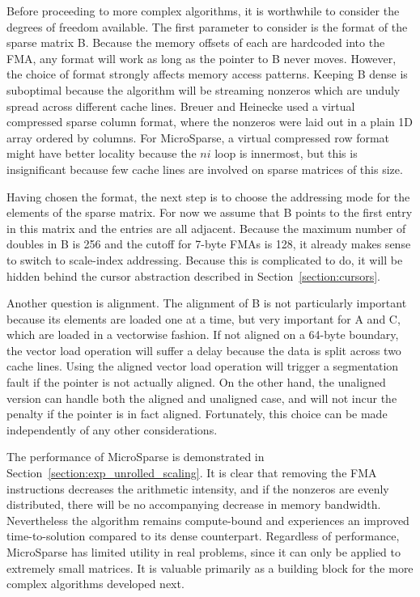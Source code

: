 Before proceeding to more complex algorithms, it is worthwhile to consider the degrees of freedom available. The first parameter to consider is the format of the sparse matrix B. Because the memory offsets of each  are hardcoded into the FMA, any format will work as long as the pointer to B never moves. However, the choice of format strongly affects memory access patterns. Keeping B dense is suboptimal because the algorithm will be streaming nonzeros which are unduly spread across different cache lines. Breuer and Heinecke used a virtual compressed sparse column format, where the nonzeros were laid out in a plain 1D array ordered by columns. For MicroSparse, a virtual compressed row format might have better locality because the $ni$ loop is innermost, but this is insignificant because few cache lines are involved on sparse matrices of this size. 

Having chosen the format, the next step is to choose the addressing mode for the elements of the sparse matrix. For now we assume that B points to the first entry in this matrix and the entries are all adjacent. Because the maximum number of doubles in B is 256 and the cutoff for 7-byte FMAs is 128, it already makes sense to switch to scale-index addressing. Because this is complicated to do, it will be hidden behind the cursor abstraction described in Section~\ref{section:cursors}.

Another question is alignment. The alignment of B is not particularly important because its elements are loaded one at a time, but very important for A and C, which are loaded in a vectorwise fashion. If not aligned on a 64-byte boundary, the vector load operation will suffer a delay because the data is split across two cache lines. Using the aligned vector load operation  will trigger a segmentation fault if the pointer is not actually aligned. On the other hand, the unaligned version  can handle both the aligned and unaligned case, and will not incur the penalty if the pointer is in fact aligned. Fortunately, this choice can be made independently of any other considerations.

The performance of MicroSparse is demonstrated in Section~\ref{section:exp_unrolled_scaling}. It is clear that removing the FMA instructions decreases the arithmetic intensity, and if the nonzeros are evenly distributed, there will be no accompanying decrease in memory bandwidth. Nevertheless the algorithm remains compute-bound and experiences an improved time-to-solution compared to its dense counterpart. Regardless of performance, MicroSparse has limited utility in real problems, since it can only be applied to extremely small matrices. It is valuable primarily as a building block for the more complex algorithms developed next.


